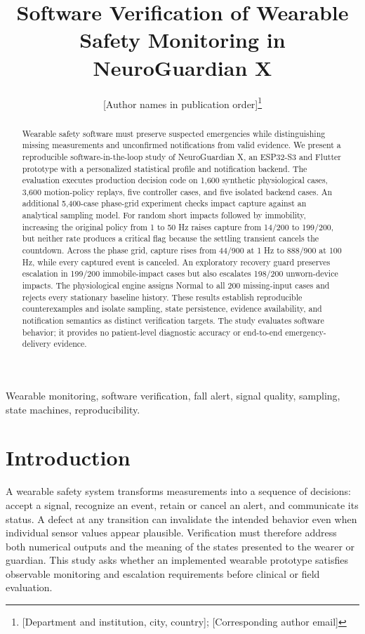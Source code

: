 \documentclass[journal]{IEEEtran}
\begin{document}
\title{Software Verification of Wearable Safety Monitoring in NeuroGuardian X}
\author{[Author names in publication order]\thanks{[Department and institution, city, country]; [Corresponding author email]}}
\maketitle
\begin{abstract}Wearable safety software must preserve suspected emergencies while distinguishing missing measurements and unconfirmed notifications from valid evidence. We present a reproducible software-in-the-loop study of NeuroGuardian X, an ESP32-S3 and Flutter prototype with a personalized statistical profile and notification backend. The evaluation executes production decision code on 1,600 synthetic physiological cases, 3,600 motion-policy replays, five controller cases, and five isolated backend cases. An additional 5,400-case phase-grid experiment checks impact capture against an analytical sampling model. For random short impacts followed by immobility, increasing the original policy from 1 to 50 Hz raises capture from 14/200 to 199/200, but neither rate produces a critical flag because the settling transient cancels the countdown. Across the phase grid, capture rises from 44/900 at 1 Hz to 888/900 at 100 Hz, while every captured event is canceled. An exploratory recovery guard preserves escalation in 199/200 immobile-impact cases but also escalates 198/200 unworn-device impacts. The physiological engine assigns Normal to all 200 missing-input cases and rejects every stationary baseline history. These results establish reproducible counterexamples and isolate sampling, state persistence, evidence availability, and notification semantics as distinct verification targets. The study evaluates software behavior; it provides no patient-level diagnostic accuracy or end-to-end emergency-delivery evidence.\end{abstract}
\begin{IEEEkeywords}Wearable monitoring, software verification, fall alert, signal quality, sampling, state machines, reproducibility.\end{IEEEkeywords}
\section{Introduction}
A wearable safety system transforms measurements into a sequence of decisions: accept a signal, recognize an event, retain or cancel an alert, and communicate its status. A defect at any transition can invalidate the intended behavior even when individual sensor values appear plausible. Verification must therefore address both numerical outputs and the meaning of the states presented to the wearer or guardian. This study asks whether an implemented wearable prototype satisfies observable monitoring and escalation requirements before clinical or field evaluation.
\end{document}
